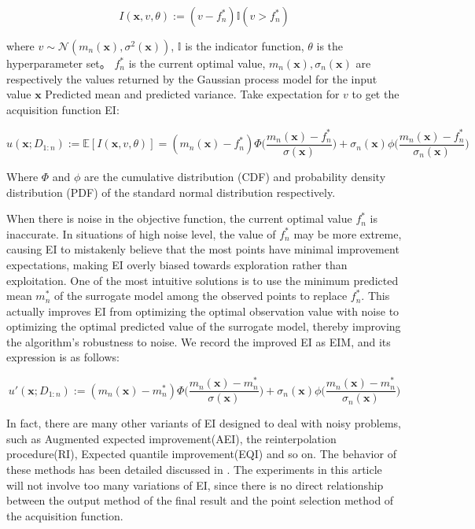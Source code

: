 \documentclass{article}
\begin{document}
\begin{equation}\label{eq6}
	\textit{I}(\textbf{x},v,\theta):=(v-f^*_n)\mathbb{I}(v>f^*_n)
\end{equation}

where $v\sim \mathcal{N}(m_n(\textbf{x}),\sigma^2(\textbf{x}))$, $\mathbb{I}$ is the indicator function, $\theta$ is the hyperparameter set。
$f^*_n$ is the current optimal value, $m_n(\textbf{x}),\sigma_n(\textbf{x})$ are respectively the values returned by the Gaussian process model for the input value $\textbf{x}$ Predicted mean and predicted variance.
Take expectation for $v$ to get the acquisition function EI:

\begin{equation}\label{eq7}
	u(\textbf{x};D_{1:n}):=\mathbb{E}[\textit{I}(\textbf{x},v,\theta)]=(m_n(\textbf{x})-f^*_n)\Phi \Big(\frac{m_n(\textbf{x})-f^*_n}{\sigma(\textbf{x})}\Big)+\sigma_n(\textbf{x})\phi \Big(\frac{m_n(\textbf{x})-f^*_n}{\sigma_n(\textbf{x})} \Big)
\end{equation}

Where $\Phi$ and $\phi$ are the cumulative distribution (CDF) and probability density distribution (PDF) of the standard normal distribution respectively.

\hspace{2em}When there is noise in the objective function, the current optimal value $f^*_n$ is inaccurate. In situations of high noise level, the value of $f^*_n$ may be more extreme, causing EI to mistakenly believe that the
most points have minimal improvement expectations, making EI overly biased towards exploration rather than exploitation. One of the most intuitive solutions is to use the minimum predicted mean $m^*_n$ of the surrogate model among the observed points to replace $f^*_n$. This actually improves EI from optimizing the optimal observation value with noise to optimizing the optimal predicted value of the surrogate model, thereby improving the algorithm's robustness to noise. We record the improved EI as EIM, and its expression is as follows:

\begin{equation}\label{eq8}
	u'(\textbf{x};D_{1:n}):=(m_n(\textbf{x})-m^*_n)\Phi \Big(\frac{m_n(\textbf{x})-m^*_n}{\sigma(\textbf{x})}\Big)+\sigma_n(\textbf{x})\phi \Big(\frac{m_n(\textbf{x})-m^*_n}{\sigma_n(\textbf{x})} \Big)
\end{equation}

\hspace{2em}In fact, there are many other variants of EI designed to deal with noisy problems, such as Augmented expected improvement(AEI)\citep{Huang2006Global}, the reinterpolation procedure(RI)\citep{Forrester2006Design}, Expected quantile improvement(EQI)\citep{Picheny2012Quantile} and so on. The behavior of these methods has been detailed discussed in \citep{Picheny2013benchmark}. The experiments in this article will not involve too many variations of EI, since there is no direct relationship between the output method of the final result and the point selection method of the acquisition function.
\end{document}
